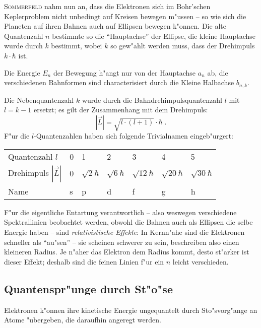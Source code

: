 \documentclass[a4paper,draft]{article}
\begin{document}
\textsc{Sommerfeld} nahm nun an, dass die Elektronen sich im
Bohr'schen Keplerproblem nicht unbedingt auf Kreisen bewegen m"ussen
-- so wie sich die Planeten auf ihren Bahnen auch auf Ellipsen bewegen
k"onnen. Die alte Quantenzahl $n$ bestimmte so die "`Hauptachse"' der
Ellipse, die kleine Hauptachse wurde durch $k$ bestimmt, wobei $k$ so
gew"ahlt werden muss, dass der Drehimpuls $k \cdot \hbar$ ist. 

Die Energie $E_n$ der Bewegung h"angt nur von der Hauptachse $a_n$ ab,
die verschiedenen Bahnformen sind characterisiert durch die Kleine
Halbachse $b_{n, k}$.

Die Nebenquantenzahl $k$ wurde durch die Bahndrehimpulsquantenzahl $l$
mit $l = k-1$ ersetzt; es gilt der Zusammenhang mit dem Drehimpuls:
\begin{equation}
  \label{eqn-drehimpuls-quantenzahl}
  | \vec L | = \sqrt{ l \cdot (l+1) } \cdot \hbar \;.
\end{equation}
F"ur die $l$-Quantenzahlen haben sich folgende Trivialnamen
eingeb"urgert:
\begin{center}
\begin{tabular}[h]{l  l l l l l l}
  Quantenzahl $l$ & 0 & 1 & 2 & 3 & 4 & 5 \\
  Drehimpuls $|\vec L|$ & $0$ & $\sqrt 2 \hbar$ & $\sqrt 6 \hbar$ &
  $\sqrt{12} \hbar$ & $\sqrt{20} \hbar$ & $\sqrt{30} \hbar$\\
  Name & s & p & d & f & g & h
\end{tabular}
\end{center}

\abs
F"ur die eigentliche Entartung verantwortlich -- also weswegen
verschiedene Spektrallinien beobachtet werden, obwohl die Bahnen auch
als Ellipsen die selbe Energie haben -- sind \emph{relativistische
  Effekte}: In Kernn"ahe sind die Elektronen schneller  als
"`au"sen"' -- sie scheinen schwerer zu sein, beschreiben also einen
kleineren Radius. Je n"aher das Elektron dem Radius kommt, desto
st"arker ist dieser Effekt; deshalb sind die feinen Linien f"ur ein
$n$ leicht verschieden.





\subsection{Quantenspr"unge durch St"o"se}
\label{sec:quantensprunge_durch_stose}

Elektronen k"onnen ihre kinetische Energie ungequantelt durch
Sto"svorg"ange an Atome "ubergeben, die daraufhin angeregt werden. 
\end{document}
